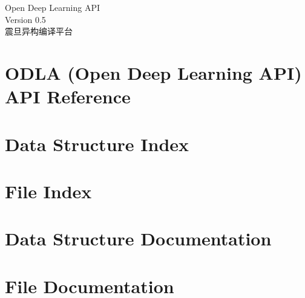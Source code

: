 \documentclass[twoside]{book}
\newcommand{\+}{\discretionary{\mbox{\scriptsize$\hookleftarrow$}}{}{}}
\newcommand{\clearemptydoublepage}{%
  \newpage{\pagestyle{empty}\cleardoublepage}%
}
\begin{document}
\hypersetup{pageanchor=false,
             bookmarksnumbered=true,
             pdfencoding=unicode
            }
\begin{titlepage}
\vspace*{7cm}
\begin{center}%
{\Large Open Deep Learning API}\\
\vspace*{1cm}
{\large Version 0.5}\\
\vspace*{2cm}
{\large 震旦异构编译平台} \\
\end{center}
\end{titlepage}
\clearemptydoublepage
{}
\tableofcontents
\clearemptydoublepage
{}
\hypersetup{pageanchor=true}
\chapter{ODLA (Open Deep Learning API) API Reference}
\label{index}\hypertarget{index}{}
\chapter{Data Structure Index}

\chapter{File Index}

\chapter{Data Structure Documentation}






\chapter{File Documentation}


































  \backmatter
  \newpage
  \clearemptydoublepage
  \printindex
\end{document}
